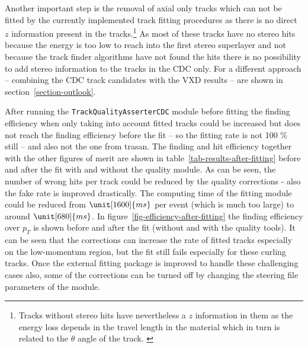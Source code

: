 Another important step is the removal of axial only tracks which can not be fitted by the currently implemented track fitting procedures as there is no direct $z$ information present in the tracks.\footnote{Tracks without stereo hits have nevertheless a $z$ information in them as the energy loss depends in the travel length in the material which in turn is related to the $\theta$ angle of the track. \cite{martin}} As most of these tracks have no stereo hits because the energy is too low to reach into the first stereo superlayer and not because the track finder algorithms have not found the hits there is no possibility to add stereo information to the tracks in the CDC only. For a different approach -- combining the CDC track candidates with the VXD results -- are shown in section~\ref{section-outlook}.

After running the \texttt{Track\-Quality\-Asserter\-CDC} module before fitting the finding efficiency when only taking into account fitted tracks could be increased but does not reach the finding efficiency before the fit -- so the fitting rate is not 100 \% still -- and also not the one from trasan. The finding and hit efficiency together with the other figures of merit are shown in table~\ref{tab-results-after-fitting} before and after the fit with and without the quality module. As can be seen, the number of wrong hits per track could be reduced by the quality corrections - also the fake rate is improved drastically. The computing time of the fitting module could be reduced from $\unit[1600]{ms}$ per event (which is much too large) to around $\unit[680]{ms}$. In figure~\ref{fig-efficiency-after-fitting} the finding efficiency over $p_T$ is shown before and after the fit (without and with the quality tools). It can be seen that the corrections can increase the rate of fitted tracks especially on the low-momentum region, but the fit still fails especially for these curling tracks. Once the external fitting package is improved to handle these challenging cases also, some of the corrections can be turned off by changing the steering file parameters of the module.

